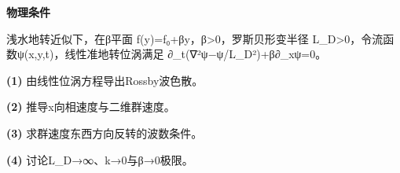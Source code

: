 \textbf{物理条件}\par 浅水地转近似下，在β平面 f(y)=f₀+βy，β>0，罗斯贝形变半径 L\_D>0，令流函数ψ(x,y,t)，线性准地转位涡满足 ∂\_t(∇²ψ−ψ/L\_D²)+β∂\_xψ=0。
\par\noindent\textbf{(1)} 由线性位涡方程导出Rossby波色散。
\par\noindent\textbf{(2)} 推导x向相速度与二维群速度。
\par\noindent\textbf{(3)} 求群速度东西方向反转的波数条件。
\par\noindent\textbf{(4)} 讨论L\_D→∞、k→0与β→0极限。
